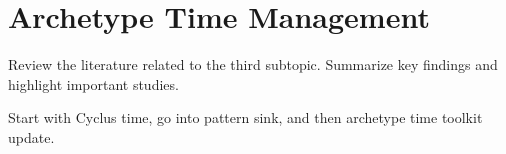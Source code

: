 \section{Archetype Time Management}
\label{sec:time_method}
Review the literature related to the third subtopic. Summarize key findings and highlight important studies.

Start with Cyclus time, go into pattern sink, and then archetype time toolkit update.